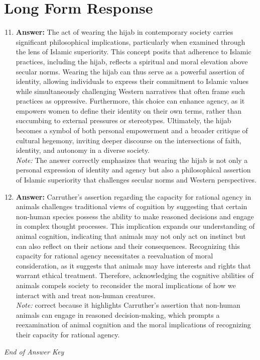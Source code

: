 \documentclass[12pt]{article}
\begin{document}
\section*{Long Form Response}
\begin{enumerate}[label=\arabic*.]
\setcounter{enumi}{10}
\item \textbf{Answer:} The act of wearing the hijab in contemporary society carries significant philosophical implications, particularly when examined through the lens of Islamic superiority. This concept posits that adherence to Islamic practices, including the hijab, reflects a spiritual and moral elevation above secular norms. Wearing the hijab can thus serve as a powerful assertion of identity, allowing individuals to express their commitment to Islamic values while simultaneously challenging Western narratives that often frame such practices as oppressive. Furthermore, this choice can enhance agency, as it empowers women to define their identity on their own terms, rather than succumbing to external pressures or stereotypes. Ultimately, the hijab becomes a symbol of both personal empowerment and a broader critique of cultural hegemony, inviting deeper discourse on the intersections of faith, identity, and autonomy in a diverse society.
\\ \textit{Note:} The answer correctly emphasizes that wearing the hijab is not only a personal expression of identity and agency but also a philosophical assertion of Islamic superiority that challenges secular norms and Western perspectives.
\item \textbf{Answer:} Carruther's assertion regarding the capacity for rational agency in animals challenges traditional views of cognition by suggesting that certain non-human species possess the ability to make reasoned decisions and engage in complex thought processes. This implication expands our understanding of animal cognition, indicating that animals may not only act on instinct but can also reflect on their actions and their consequences. Recognizing this capacity for rational agency necessitates a reevaluation of moral consideration, as it suggests that animals may have interests and rights that warrant ethical treatment. Therefore, acknowledging the cognitive abilities of animals compels society to reconsider the moral implications of how we interact with and treat non-human creatures.
\\ \textit{Note:} correct because it highlights Carruther's assertion that non-human animals can engage in reasoned decision-making, which prompts a reexamination of animal cognition and the moral implications of recognizing their capacity for rational agency.
\end{enumerate}

\vfill
\noindent\textit{End of Answer Key}
\end{document}
